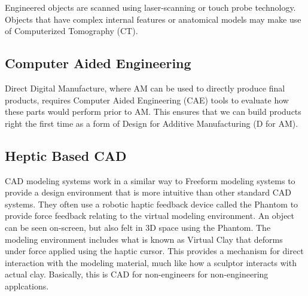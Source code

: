 Engineered objects are scanned using laser-scanning or touch probe technology. Objects that have complex internal features or anatomical
models may make use of Computerized Tomography (CT).

\subsection{Computer Aided Engineering}
Direct Digital Manufacture, where AM can be used to directly produce
final products, requires Computer Aided Engineering (CAE) tools to evaluate how these parts
would perform prior to AM. This ensures that we can build products right the first time as a
form of Design for Additive Manufacturing (D for AM).

\subsection{Heptic Based CAD}
CAD modeling systems work
in a similar way to Freeform modeling systems to
provide a design environment that is more intuitive than other standard CAD
systems. They often use a robotic haptic feedback device called the Phantom to provide force feedback relating to the virtual modeling environment. An object can
be seen on-screen, but also felt in 3D space using the Phantom. The modeling
environment includes what is known as Virtual Clay that deforms under force
applied using the haptic cursor. This provides a mechanism for direct interaction
with the modeling material, much like how a sculptor interacts with actual clay. Basically, this is CAD for non-engineers for non-engineering applcations.

